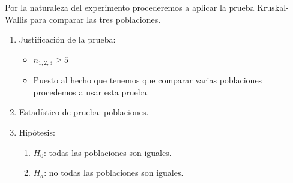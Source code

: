 Por la naturaleza del experimento procederemos a aplicar la prueba Kruskal-Wallis para comparar las tres poblaciones.

\begin{enumerate}
    \item Justificación de la prueba: 
        \begin{itemize}
            \item $n_{1,2,3} \geq 5$
            \item Puesto al hecho que tenemos que comparar varias poblaciones procedemos a usar esta prueba. 
        \end{itemize}
    \item Estadístico de prueba: poblaciones.
    \item Hipótesis: 
        \begin{enumerate}
            \item $H_0$: todas las poblaciones son iguales. %
            \item $H_a$: no todas las poblaciones son iguales. %
        \end{enumerate}
    

\end{enumerate}
